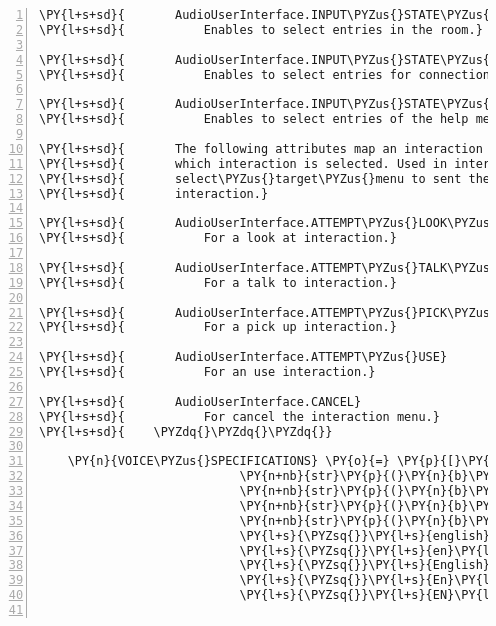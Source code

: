 \begin{Verbatim}[commandchars=\\\{\},numbers=left,firstnumber=1,stepnumber=1]
\PY{l+s+sd}{       AudioUserInterface.INPUT\PYZus{}STATE\PYZus{}SEE\PYZus{}ROOM}
\PY{l+s+sd}{           Enables to select entries in the room.}

\PY{l+s+sd}{       AudioUserInterface.INPUT\PYZus{}STATE\PYZus{}CONNECTION\PYZus{}DETAILS}
\PY{l+s+sd}{           Enables to select entries for connection detail input.}

\PY{l+s+sd}{       AudioUserInterface.INPUT\PYZus{}STATE\PYZus{}HELP\PYZus{}MENU}
\PY{l+s+sd}{           Enables to select entries of the help menu.}

\PY{l+s+sd}{       The following attributes map an interaction to numeric values to decide}
\PY{l+s+sd}{       which interaction is selected. Used in interaction\PYZus{}sound\PYZus{}menu and}
\PY{l+s+sd}{       select\PYZus{}target\PYZus{}menu to sent the event corresponding to the current}
\PY{l+s+sd}{       interaction.}

\PY{l+s+sd}{       AudioUserInterface.ATTEMPT\PYZus{}LOOK\PYZus{}AT}
\PY{l+s+sd}{           For a look at interaction.}

\PY{l+s+sd}{       AudioUserInterface.ATTEMPT\PYZus{}TALK\PYZus{}TO}
\PY{l+s+sd}{           For a talk to interaction.}

\PY{l+s+sd}{       AudioUserInterface.ATTEMPT\PYZus{}PICK\PYZus{}UP}
\PY{l+s+sd}{           For a pick up interaction.}

\PY{l+s+sd}{       AudioUserInterface.ATTEMPT\PYZus{}USE}
\PY{l+s+sd}{           For an use interaction.}

\PY{l+s+sd}{       AudioUserInterface.CANCEL}
\PY{l+s+sd}{           For cancel the interaction menu.}
\PY{l+s+sd}{    \PYZdq{}\PYZdq{}\PYZdq{}}

    \PY{n}{VOICE\PYZus{}SPECIFICATIONS} \PY{o}{=} \PY{p}{[}\PY{n+nb}{str}\PY{p}{(}\PY{n}{b}\PY{l+s}{\PYZsq{}}\PY{l+s}{english}\PY{l+s}{\PYZsq{}}\PY{p}{)}\PY{p}{,}
                            \PY{n+nb}{str}\PY{p}{(}\PY{n}{b}\PY{l+s}{\PYZsq{}}\PY{l+s}{English}\PY{l+s}{\PYZsq{}}\PY{p}{)}\PY{p}{,}
                            \PY{n+nb}{str}\PY{p}{(}\PY{n}{b}\PY{l+s}{\PYZsq{}}\PY{l+s}{en}\PY{l+s}{\PYZsq{}}\PY{p}{)}\PY{p}{,}
                            \PY{n+nb}{str}\PY{p}{(}\PY{n}{b}\PY{l+s}{\PYZsq{}}\PY{l+s}{En}\PY{l+s}{\PYZsq{}}\PY{p}{)}\PY{p}{,}
                            \PY{n+nb}{str}\PY{p}{(}\PY{n}{b}\PY{l+s}{\PYZsq{}}\PY{l+s}{EN}\PY{l+s}{\PYZsq{}}\PY{p}{)}\PY{p}{,}
                            \PY{l+s}{\PYZsq{}}\PY{l+s}{english}\PY{l+s}{\PYZsq{}}\PY{p}{,}
                            \PY{l+s}{\PYZsq{}}\PY{l+s}{en}\PY{l+s}{\PYZsq{}}\PY{p}{,}
                            \PY{l+s}{\PYZsq{}}\PY{l+s}{English}\PY{l+s}{\PYZsq{}}\PY{p}{,}
                            \PY{l+s}{\PYZsq{}}\PY{l+s}{En}\PY{l+s}{\PYZsq{}}\PY{p}{,}
                            \PY{l+s}{\PYZsq{}}\PY{l+s}{EN}\PY{l+s}{\PYZsq{}}\PY{p}{]}


\end{Verbatim}
